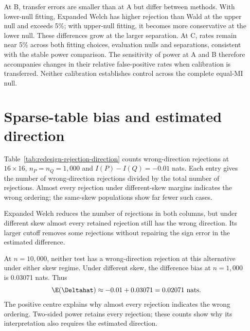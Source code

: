 At B, transfer errors are smaller than at A but differ between methods.
With lower-null fitting, Expanded Welch has higher rejection than Wald
at the upper null and exceeds 5\%; with upper-null fitting, it becomes more
conservative at the lower null. These differences grow at the larger
separation. At C, rates remain near 5\% across both fitting choices,
evaluation nulls and separations, consistent with the stable power
comparison. The sensitivity of power at A and B therefore accompanies
changes in their relative false-positive rates when calibration is
transferred. Neither calibration establishes control across the
complete equal-MI null.

\section{Sparse-table bias and estimated direction}

Table~\ref{tab:redesign-rejection-direction} counts wrong-direction
rejections at \(16\times16\), \(n_P=n_Q=1{,}000\) and
\(I(P)-I(Q)=-0.01\) nats. Each entry gives the number of wrong-direction
rejections divided by the total number of rejections. Almost every
rejection under different-skew margins indicates the wrong ordering;
the same-skew populations show far fewer such cases.

\begin{table}[!htbp]
\centering
\caption{Wrong-direction counts among rejections at the negative MI difference.}
\label{tab:redesign-rejection-direction}

\end{table}

Expanded Welch reduces the number of rejections in both columns, but
under different skew almost every retained rejection still has the
wrong direction. Its larger cutoff removes some rejections without
repairing the sign error in the estimated difference.

At \(n=10{,}000\), neither test has a wrong-direction rejection at this alternative under either skew
regime. Under different skew, the difference bias at \(n=1{,}000\)
is 0.03071 nats. Thus
\begin{equation}
 \E(\Deltahat)\approx-0.01+0.03071=0.02071\text{ nats}.
 \label{eq:redesign-alternative-bias-shift}
\end{equation}
The positive centre explains why almost every rejection indicates the
wrong ordering. Two-sided power retains every rejection; these counts
show why its interpretation also requires the estimated direction.

